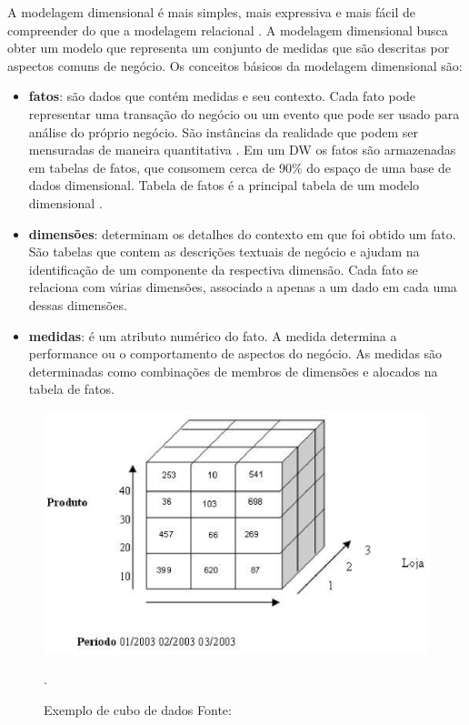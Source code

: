 A modelagem dimensional é mais simples, mais expressiva e mais fácil de compreender do que a modelagem relacional \cite{ballard1998}. A modelagem dimensional busca obter um modelo que representa um conjunto de medidas que são descritas por aspectos comuns de negócio.
%
Os conceitos básicos da modelagem dimensional são:

\begin{itemize}
	\item \textbf{fatos}: são dados que contém medidas e seu contexto. Cada fato pode representar uma transação do negócio ou um evento que pode ser usado para análise do próprio negócio. São instâncias da realidade  que podem ser mensuradas de maneira quantitativa \cite{kimball2002}. Em um DW os fatos são armazenadas em tabelas de fatos, que consomem cerca de 90\% do espaço de uma base de dados dimensional. Tabela de fatos é a principal tabela de um modelo dimensional \cite{kimball2002,ballard1998}.

	\item \textbf{dimensões}: determinam os detalhes do contexto em que foi obtido um fato. São tabelas que contem as descrições textuais de negócio e ajudam na identificação de um componente da respectiva dimensão. Cada fato se relaciona com várias dimensões, associado a apenas a um dado em cada uma dessas dimensões.

	\item \textbf{medidas}: é um atributo numérico do fato. A medida determina a performance ou o comportamento de aspectos do negócio. As medidas são determinadas como combinações de membros de dimensões e alocados na tabela de fatos.
\end{itemize}


 \begin{figure}[!htb]
 	\centering
 		\includegraphics[scale=0.8]{figuras/dw-cubo}
 		\caption{Exemplo de cubo de dados Fonte: \cite{Guimaraes2012}}.
 		\label{dw-cube}
 \end{figure}

